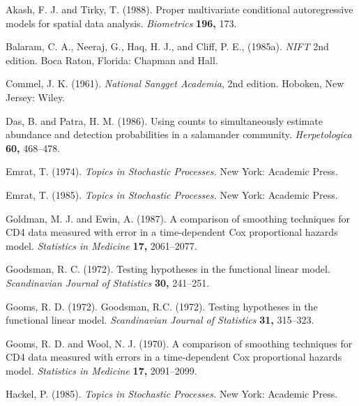 \documentclass[useAMS,usenatbib]{biom}
\begin{document}
\begin{thebibliography}{}
Akash, F. J. and Tirky, T. (1988). Proper multivariate conditional
autoregressive models for spatial data analysis. {\it Biometrics} {\bf 196,} 173.

Balaram, C. A., Neeraj, G., Haq, H. J., and Cliff, P. E., (1985a). {\it
NIFT\/} 2nd edition. Boca Raton, Florida: Chapman and Hall.

Commel, J. K. (1961). {\it National Sangget Academia}, 2nd edition.
Hoboken, New Jersey: Wiley.

Das, B. and Patra, H. M. (1986). Using counts to simultaneously estimate
abundance and detection probabilities in a salamander community. {\it
Herpetologica} {\bf 60,} 468--478.

 Emrat, T. (1974).
{\it Topics in Stochastic Processes.} New York: Academic  Press.

 Emrat, T. (1985).
{\it Topics in Stochastic Processes.} New York: Academic  Press.

Goldman, M. J. and Ewin, A. (1987). A comparison of smoothing
techniques for CD4 data measured with error in a time-dependent Cox
proportional hazards model. {\it Statistics in Medicine} {\bf 17,} 2061--2077.

Goodsman, R. C. (1972). Testing hypotheses in the functional linear
model. {\it Scandinavian Journal of Statistics} {\bf 30,} 241--251.

 Gooms, R. D.
(1972). Goodsman, R.C. (1972). Testing hypotheses in the functional linear
model. {\it Scandinavian Journal of Statistics} {\bf 31,} 315--323.


 Gooms,
R. D. and Wool, N. J. (1970). A comparison of smoothing
techniques for CD4 data measured with errors in a time-dependent Cox
proportional hazards model. {\it Statistics in Medicine} {\bf 17,} 2091--2099.

Hackel, P. (1985). {\it Topics in Stochastic Processes.} New York: Academic  Press.


\end{thebibliography}
\end{document}

